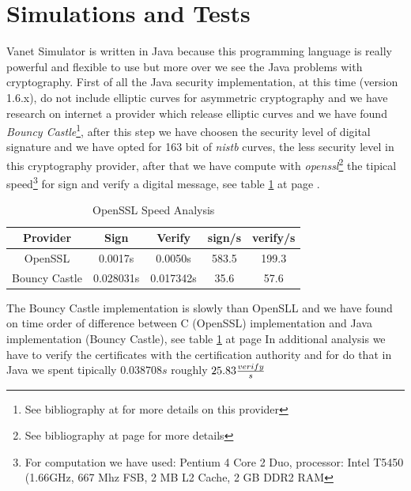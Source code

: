 \section{Simulations and Tests}
Vanet Simulator is written in Java because this programming language is really powerful and flexible to use but more over we see the Java problems with cryptography. First of all the Java security implementation, at this time (version 1.6.x), do not include elliptic curves for asymmetric cryptography and we have research on internet a provider which release elliptic curves and we have found \textit{Bouncy Castle}\footnote{See bibliography at \pageref{bibliography} for more details on this provider}, after this step we have choosen the security level of digital signature and we have opted for 163 bit of \textit{nistb} curves, the less security level in this cryptography provider, after that we have compute with \emph{openssl}\footnote{See bibliography at page \pageref{bibliography} for more details} the tipical speed\footnote{For computation we have used: Pentium 4 Core 2 Duo, processor: Intel T5450 (1.66GHz, 667 Mhz FSB, 2 MB L2 Cache, 2 GB DDR2 RAM} for sign and verify a digital message, see table \ref{tab:OpensslVelocity} at page \pageref{tab:OpensslVelocity}.
\begin{table}[!ht]
	\centering
	\caption{OpenSSL Speed Analysis}
	\begin{tabular}{|c|c|c|c|c|}
	\hline\hline 
	\textbf{Provider} & \textbf{Sign} & \textbf{Verify} & \textbf{sign/s} & \textbf{verify/s} \\
	\hline
	OpenSSL & 0.0017s & 0.0050s & 583.5 & 199.3 \\
	\hline
	Bouncy Castle & 0.028031s & 0.017342s & 35.6 & 57.6 \\
	\hline
	\hline     %
 	\end{tabular} 
	\label{tab:OpensslVelocity}
\end{table}
The Bouncy Castle implementation is slowly than OpenSLL and we have found on time order of difference between C (OpenSSL)  implementation and Java implementation (Bouncy Castle), see table \ref{tab:OpensslVelocity} at page 
In additional analysis we have to verify the certificates with the certification authority and for do that in Java we spent tipically $0.038708s$ roughly $25.83 {verify \over s}$
